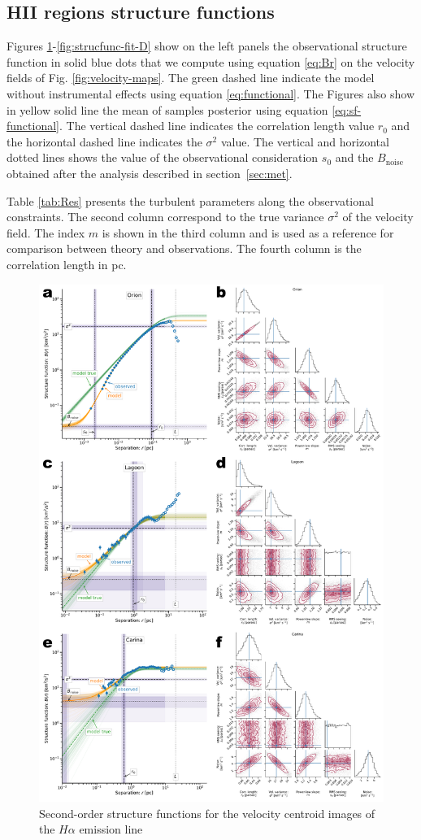 \documentclass[fleqn,usenatbib, useAMS, a4paper]{mnras}
\begin{document}
\subsection{HII regions structure functions}

Figures \ref{fig:strucfunc-fit-A}-\ref{fig:strucfunc-fit-D} show on the left panels the observational structure function in solid blue dots that we compute using equation \ref{eq:Br} on the velocity fields of Fig. \ref{fig:velocity-maps}.
The green dashed line indicate the model without instrumental effects using equation \ref{eq:functional}.
The Figures also show in yellow solid line the mean of samples posterior using equation \ref{eq:sf-functional}.
The vertical dashed line indicates the correlation length value \(r_0\) and the horizontal dashed line indicates the \(\sigma^2\) value.
The vertical and horizontal dotted lines shows the value of the observational consideration \(s_0\) and the \(B_{\text{noise}}\) obtained after the analysis described in section~\ref{sec:met}.
 
Table \ref{tab:Res} presents the turbulent parameters along the observational constraints.
The second column correspond to the true variance \(\sigma^2\) of the velocity field.
The index \(m\) is shown in the third column and is used as a reference for comparison between theory and observations.
The fourth column is the correlation length in pc.

\begin{figure}
  \centering
  \includegraphics[width=0.8\linewidth]{Figures/strucfunc-fit-A}
  \caption{Second-order structure functions for the velocity centroid images of the \(H\alpha\) emission line}\label{fig:strucfunc-fit-A}
\end{figure}
\end{document}
